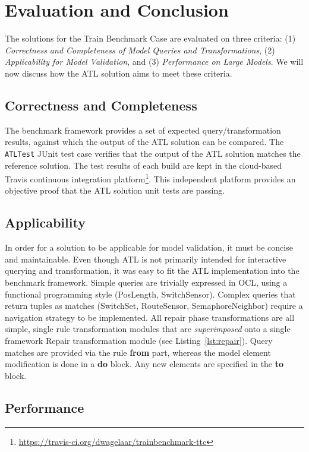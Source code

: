 \documentclass[submission,copyright,creativecommons]{eptcs}
\begin{document}
\section{Evaluation and Conclusion}
\label{sec:eval}

The solutions for the Train Benchmark Case are evaluated on three criteria: (1) \emph{Correctness and Completeness of Model Queries and Transformations}, (2) \emph{Applicability for Model Validation}, and (3) \emph{Performance on Large Models}. We will now discuss how the ATL solution aims to meet these criteria.

\subsection{Correctness and Completeness}

The benchmark framework provides a set of expected query/transformation results, against which the output of the ATL solution can be compared. The \texttt{ATLTest} JUnit test case verifies that the output of the ATL solution matches the reference solution. The test results of each build are kept in the cloud-based Travis continuous integration platform\footnote{\url{https://travis-ci.org/dwagelaar/trainbenchmark-ttc}}. This independent platform provides an objective proof that the ATL solution unit tests are passing.

\subsection{Applicability}

In order for a solution to be applicable for model validation, it must be concise and maintainable. Even though ATL is not primarily intended for interactive querying and transformation, it was easy to fit the ATL implementation into the benchmark framework. Simple queries are trivially expressed in OCL, using a functional programming style (PosLength, SwitchSensor). Complex queries that return tuples as matches (SwitchSet, RouteSensor, SemaphoreNeighbor) require a navigation strategy to be implemented. All repair phase transformations are all simple, single rule transformation modules that are \emph{superimposed} onto a single framework Repair transformation module (see Listing~\ref{lst:repair}). Query matches are provided via the rule \textbf{from} part, whereas the model element modification is done in a \textbf{do} block. Any new elements are specified in the \textbf{to} block.

\subsection{Performance}
\end{document}
